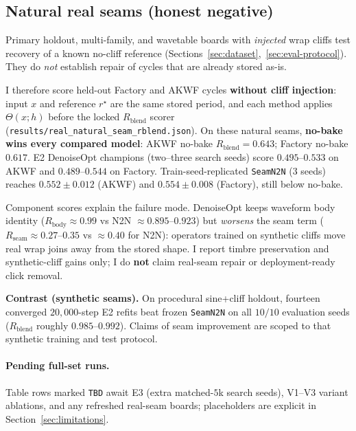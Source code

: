 \subsection{Natural real seams (honest negative)}
\label{sec:real-natural-seam}

Primary holdout, multi-family, and wavetable boards with \emph{injected} wrap cliffs test recovery of a known no-cliff reference (Sections~\ref{sec:dataset},~\ref{sec:eval-protocol}).
They do \emph{not} establish repair of cycles that are already stored as-is.

I therefore score held-out Factory and AKWF cycles \textbf{without cliff injection}: input $x$ and reference $r^{\star}$ are the same stored period, and each method applies $\Theta(x;h)$ before the locked $R_{\mathrm{blend}}$ scorer (\texttt{results/real\_natural\_seam\_rblend.json}).
On these natural seams, \textbf{no-bake wins every compared model}: AKWF no-bake $R_{\mathrm{blend}}{=}0.643$; Factory no-bake $0.617$.
E2 DenoiseOpt champions (two--three search seeds) score $0.495$--$0.533$ on AKWF and $0.489$--$0.544$ on Factory.
Train-seed-replicated \texttt{SeamN2N} ($3$ seeds) reaches $0.552{\pm}0.012$ (AKWF) and $0.554{\pm}0.008$ (Factory), still below no-bake.

Component scores explain the failure mode.
DenoiseOpt keeps waveform body identity ($R_{\mathrm{body}}{\approx}0.99$ vs N2N ${\approx}0.895$--$0.923$) but \emph{worsens} the seam term ($R_{\mathrm{seam}}{\approx}0.27$--$0.35$ vs ${\approx}0.40$ for N2N): operators trained on synthetic cliffs move real wrap joins away from the stored shape.
I report timbre preservation and synthetic-cliff gains only; I do \textbf{not} claim real-seam repair or deployment-ready click removal.

\textbf{Contrast (synthetic seams).}
On procedural sine+cliff holdout, fourteen converged $20{,}000$-step E2 refits beat frozen \texttt{SeamN2N} on all $10/10$ evaluation seeds ($R_{\mathrm{blend}}$ roughly $0.985$--$0.992$).
Claims of seam improvement are scoped to that synthetic training and test protocol.

\paragraph{Pending full-set runs.}
Table rows marked \texttt{TBD} await E3 (extra matched-$5$k search seeds), V1--V3 variant ablations, and any refreshed real-seam boards; placeholders are explicit in Section~\ref{sec:limitations}.